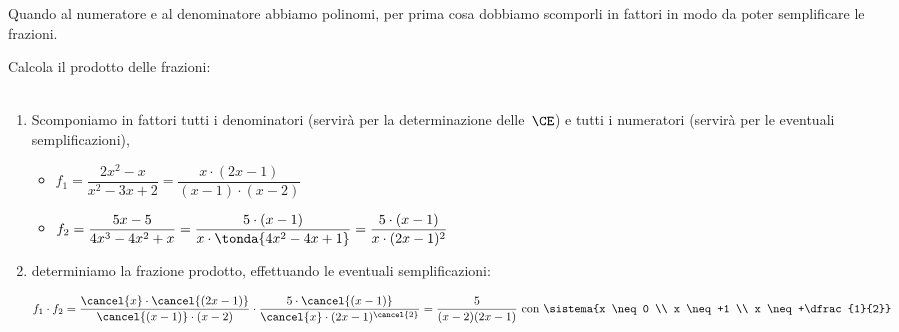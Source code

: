 Quando al numeratore e al denominatore abbiamo polinomi, per prima cosa 
dobbiamo scomporli in fattori in modo da poter semplificare le frazioni.

\begin{esempio}{}{}
Calcola il prodotto delle frazioni: \\
\\ [-.5em]

\begin{enumerate} [left=0mm]
\item Scomponiamo in fattori tutti i denominatori (servirà per la 
determinazione delle~\(\CE\)) e
  tutti i numeratori (servirà per le eventuali semplificazioni),
\begin{itemize}%
\item \(f_1=\dfrac{2x^2-x}{x^2-3x+2}=
            \dfrac{x \cdot (2x-1)}{(x-1) \cdot (x-2)}\)
\item \(f_2=\dfrac{5x-5}{4x^3-4x^2+x}=
            \dfrac{5 \cdot (x-1)}{x \cdot \tonda{4x^2-4x+1}}=
            \dfrac{5 \cdot (x-1)}{x \cdot (2x-1)^2}\)
\end{itemize}
\item determiniamo la frazione prodotto, effettuando le eventuali 
semplificazioni:

\vspace{-2.0em}
\[f_1 \cdot f_2 = 
\dfrac{\cancel{x} \cdot \cancel{(2x-1)}}{\cancel{(x-1)} \cdot {(x-2)}} \cdot 
\dfrac{5\cdot\cancel{(x-1)}}{\cancel{x}\cdot(2x-1)^{\cancel{2}}}=
\dfrac{5}{(x-2)(2x-1)} \text{ con }
\sistema{x \neq 0 \\ x \neq +1 \\ x \neq +\dfrac{1}{2}}
\]

\end{enumerate}
\end{esempio}

